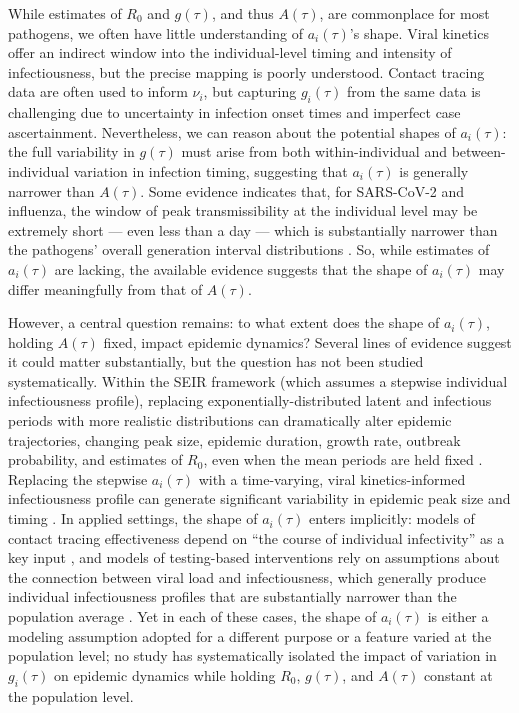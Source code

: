While estimates of $R_0$ and $g(\tau)$, and thus $A(\tau)$, are commonplace for most pathogens, we often have little understanding of $a_i(\tau)$'s shape. Viral kinetics offer an indirect window into the individual-level timing and intensity of infectiousness, but the precise mapping is poorly understood. Contact tracing data are often used to inform $\nu_i$, but capturing $g_i(\tau)$ from the same data is challenging due to uncertainty in infection onset times and imperfect case ascertainment. Nevertheless, we can reason about the potential shapes of $a_i(\tau)$: the full variability in $g(\tau)$ must arise from both within-individual and between-individual variation in infection timing, suggesting that $a_i(\tau)$ is generally narrower than $A(\tau)$. Some evidence indicates that, for SARS-CoV-2 and influenza, the window of peak transmissibility at the individual level may be extremely short --- even less than a day --- which is substantially narrower than the pathogens' overall generation interval distributions \citep{goyal_viral_2021}. So, while estimates of $a_i(\tau)$ are lacking, the available evidence suggests that the shape of $a_i(\tau)$ may differ meaningfully from that of $A(\tau)$. 


However, a central question remains: to what extent does the shape of $a_i(\tau)$, holding $A(\tau)$ fixed, impact epidemic dynamics? Several lines of evidence suggest it could matter substantially, but the question has not been studied systematically. Within the SEIR framework (which assumes a stepwise individual infectiousness profile), replacing exponentially-distributed latent and infectious periods with more realistic distributions can dramatically alter epidemic trajectories, changing peak size, epidemic duration, growth rate, outbreak probability, and estimates of $R_0$, even when the mean periods are held fixed \citep{lloyd_realistic_2001, wearing_appropriate_2005, britton_epidemic_2009}. Replacing the stepwise $a_i(\tau)$ with a time-varying, viral kinetics-informed infectiousness profile can generate significant variability in epidemic peak size and timing \citep{li_epidemic_2023}. In applied settings, the shape of $a_i(\tau)$ enters implicitly: models of contact tracing effectiveness depend on ``the course of individual infectivity'' as a key input \citep{klinkenberg_effectiveness_2006}, and models of testing-based interventions rely on assumptions about the connection between viral load and infectiousness, which generally produce individual infectiousness profiles that are substantially narrower than the population average \citep{larremore_test_2021}. Yet in each of these cases, the shape of $a_i(\tau)$ is either a modeling assumption adopted for a different purpose or a feature varied at the population level; no study has systematically isolated  the impact of variation in $g_i(\tau)$ on epidemic  dynamics while holding $R_0$, $g(\tau)$, and $A(\tau)$ constant at the population level.

